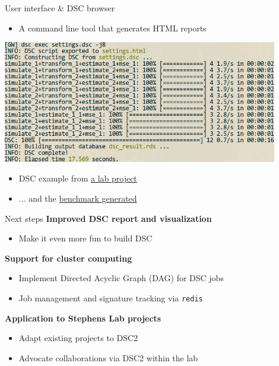 \begin{frame}{User interface \& DSC browser}
\begin{itemize}
  \item A command line tool that generates HTML reports
\end{itemize}
  \centering \includegraphics[width=0.9\textwidth]{figs/dsc6}
\begin{itemize}
  \item DSC example from \href{http://www.bioinformatics.org/labnotes/dr-tree/dsc/20160630/benchmark.html}{a lab project}
  \item ... and the
    \href{http://www.bioinformatics.org/labnotes/dr-tree/figures/20160630/simulation-brownian-20160630.html}{benchmark generated}
\end{itemize}
\end{frame}
\begin{frame}{Next steps}
  \textbf{Improved DSC report and visualization}
  \begin{itemize}
    \item Make it even more fun to build DSC
  \end{itemize}
  \textbf{Support for cluster computing}
  \begin{itemize}
    \item Implement Directed Acyclic Graph (DAG) for DSC jobs
    \item Job management and signature tracking via \texttt{redis}
  \end{itemize}
  \textbf{Application to Stephens Lab projects}
  \begin{itemize}
    \item Adapt existing projects to DSC2
    \item Advocate collaborations via DSC2 within the lab
  \end{itemize}
\end{frame}
